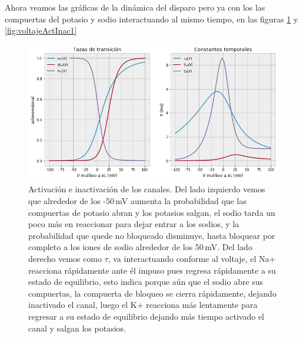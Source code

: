 Ahora veamos las gráficas de la dinámica del disparo pero ya con los las compuertas del potasio y sodio interactuando al mismo tiempo, en las figuras \ref{fig:voltajeActInac} y \ref{fig:voltajeActInac1}


\begin{figure}[h]
 \centering
 \includegraphics[scale=0.6]{../Figuras/actinac.png}
 \caption{Activación e inactivación de los canales. Del lado izquierdo vemos que alrededor de los -50 mV aumenta la probabilidad que las compuertas de potasio abran y los potasios salgan, el sodio tarda un poco más en reaccionar para dejar entrar a los sodios, y la probabilidad que quede no bloqueado disminuye, hasta bloquear por completo a los iones de sodio alrededor de los 50 mV. Del lado derecho vemos como \(\tau\), va interactuando conforme al voltaje, el Na+ reacciona rápidamente ante él impuso pues regresa rápidamente a su estado de equilibrio, esto indica porque aún que el sodio abre sus compuertas, la compuerta de bloqueo se cierra rápidamente, dejando inactivado el canal, luego el K+ reacciona más lentamente para regresar a su estado de equilibrio dejando más tiempo activado el canal y salgan los potasios.}
 \label{fig:voltajeActInac}
\end{figure}


